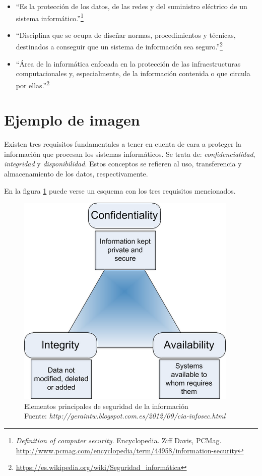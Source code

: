 \documentclass[12pt,a4paper,onecolumn,oneside]{report}
\begin{document}
\begin{itemize}

\item ``Es la protección de los datos, de las redes y del suministro eléctrico de un sistema informático.''\footnote{\textit{Definition of computer security.} Encyclopedia. Ziff Davis, PCMag. \url{http://www.pcmag.com/encyclopedia/term/44958/information-security}}

\item ``Disciplina que se ocupa de diseñar normas, procedimientos y técnicas, destinados a conseguir que un sistema de información sea seguro.''\footnote{\url{https://es.wikipedia.org/wiki/Seguridad_informática}\label{segWiki}}

\item ``Área de la informática enfocada en la protección de las infraestructuras computacionales y, especialmente, de la información contenida o que circula por ellas.''\textsuperscript{\ref{segWiki}}

\end{itemize}
 

\section*{Ejemplo de imagen}

Existen tres requisitos fundamentales a tener en cuenta de cara a proteger la información que procesan los sistemas informáticos.
Se trata de: \textit{confidencialidad}, \textit{integridad} y \textit{disponibilidad}. Estos conceptos se refieren al uso, transferencia y almacenamiento de los datos, respectivamente.

En la figura \ref{fig:fundamentos-seguridad} puede verse un esquema con los tres requisitos mencionados.

\begin{figure}[htb] 
\centering
  \includegraphics[width=.55\textwidth]{figuras/c-i-a.png}
  \caption[Elementos principales de seguridad de la información]{Elementos principales de seguridad de la información\\
  \footnotesize{Fuente: \textit{http://geraintw.blogspot.com.es/2012/09/cia-infosec.html}}}
  \label{fig:fundamentos-seguridad}
\end{figure}
\end{document}
